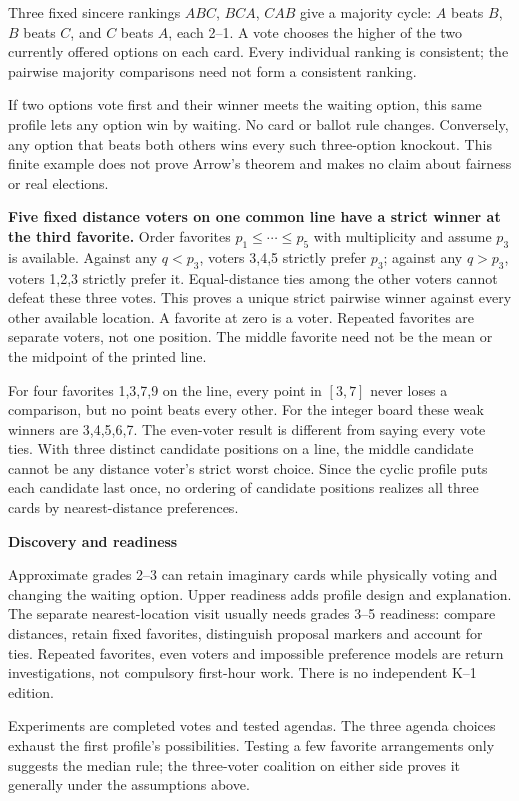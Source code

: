 \documentclass[11pt,letterpaper]{article}
\newcommand{\heading}[1]{\par\vspace{4pt}{\large\bfseries #1}\par}
\newcommand{\sub}[1]{\par\textbf{#1}\par}
\begin{document}
\heading{Mathematical overview}
Three fixed sincere rankings $ABC$, $BCA$, $CAB$ give a majority cycle: $A$ beats $B$, $B$ beats $C$, and $C$ beats $A$, each 2--1. A vote chooses the higher of the two currently offered options on each card. Every individual ranking is consistent; the pairwise majority comparisons need not form a consistent ranking.

If two options vote first and their winner meets the waiting option, this same profile lets any option win by waiting. No card or ballot rule changes. Conversely, any option that beats both others wins every such three-option knockout. This finite example does not prove Arrow's theorem and makes no claim about fairness or real elections.

\textbf{Five fixed distance voters on one common line have a strict winner at the third favorite.} Order favorites $p_1\leq\cdots\leq p_5$ with multiplicity and assume $p_3$ is available. Against any $q<p_3$, voters 3,4,5 strictly prefer $p_3$; against any $q>p_3$, voters 1,2,3 strictly prefer it. Equal-distance ties among the other voters cannot defeat these three votes. This proves a unique strict pairwise winner against every other available location. A favorite at zero is a voter. Repeated favorites are separate voters, not one position. The middle favorite need not be the mean or the midpoint of the printed line.

For four favorites 1,3,7,9 on the line, every point in $[3,7]$ never loses a comparison, but no point beats every other. For the integer board these weak winners are 3,4,5,6,7. The even-voter result is different from saying every vote ties. With three distinct candidate positions on a line, the middle candidate cannot be any distance voter's strict worst choice. Since the cyclic profile puts each candidate last once, no ordering of candidate positions realizes all three cards by nearest-distance preferences.

\sub{Discovery and readiness}
Approximate grades 2--3 can retain imaginary cards while physically voting and changing the waiting option. Upper readiness adds profile design and explanation. The separate nearest-location visit usually needs grades 3--5 readiness: compare distances, retain fixed favorites, distinguish proposal markers and account for ties. Repeated favorites, even voters and impossible preference models are return investigations, not compulsory first-hour work. There is no independent K--1 edition.

Experiments are completed votes and tested agendas. The three agenda choices exhaust the first profile's possibilities. Testing a few favorite arrangements only suggests the median rule; the three-voter coalition on either side proves it generally under the assumptions above.
\end{document}
